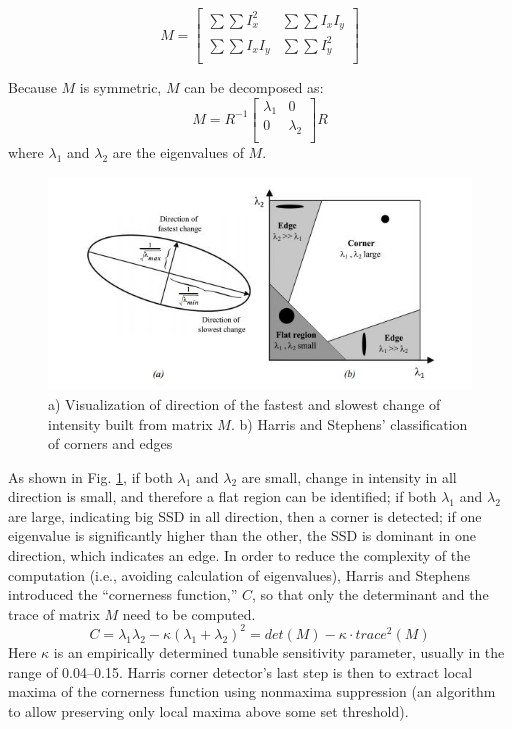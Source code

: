 \documentclass[twoside]{article}
\begin{document}
\begin{equation}
M =
\begin{bmatrix}
\sum \sum I_x^2 & \sum \sum I_x I_y \\
\sum \sum I_x I_y & \sum \sum I_y^2 \\
\end{bmatrix}
\end{equation}

Because $M$ is symmetric, $M$ can be decomposed as:
\begin{equation}
M =
R^{-1}
\begin{bmatrix}
\lambda_1 & 0\\
0 & \lambda_2\\
\end{bmatrix}
R
\end{equation}
where $\lambda_1$ and $\lambda_2$ are the eigenvalues of $M$.
\begin{figure}
	\centering
	\includegraphics{harris.JPG}
    \caption{a) Visualization of direction of the fastest and slowest change of intensity built from matrix $M$. b) Harris and Stephens' classification of corners and edges \cite{SNS}}
    \label{harris}
\end{figure}

As shown in Fig. \ref{harris}, if both $\lambda_1$ and $\lambda_2$ are small, change in intensity in all direction is small, and therefore a flat region can be identified; if both $\lambda_1$ and $\lambda_2$ are large, indicating big SSD in all direction, then a corner is detected; if one eigenvalue is significantly higher than the other, the SSD is dominant in one direction, which indicates an edge. In order to reduce the complexity of the computation (i.e., avoiding calculation of eigenvalues), Harris and Stephens introduced the ``cornerness function,'' $C$, so that only the determinant and the trace of matrix $M$ need to be computed.
\begin{equation}
C = \lambda_1 \lambda_2 - \kappa(\lambda_1+\lambda_2)^2 = det(M) - \kappa\cdot trace^2(M)
\end{equation}
Here $\kappa$ is an empirically determined tunable sensitivity parameter, usually in the range of 0.04--0.15. Harris corner detector's last step is then to extract local maxima of the cornerness function using nonmaxima suppression (an algorithm to allow preserving only local maxima above some set threshold). \\
\end{document}
